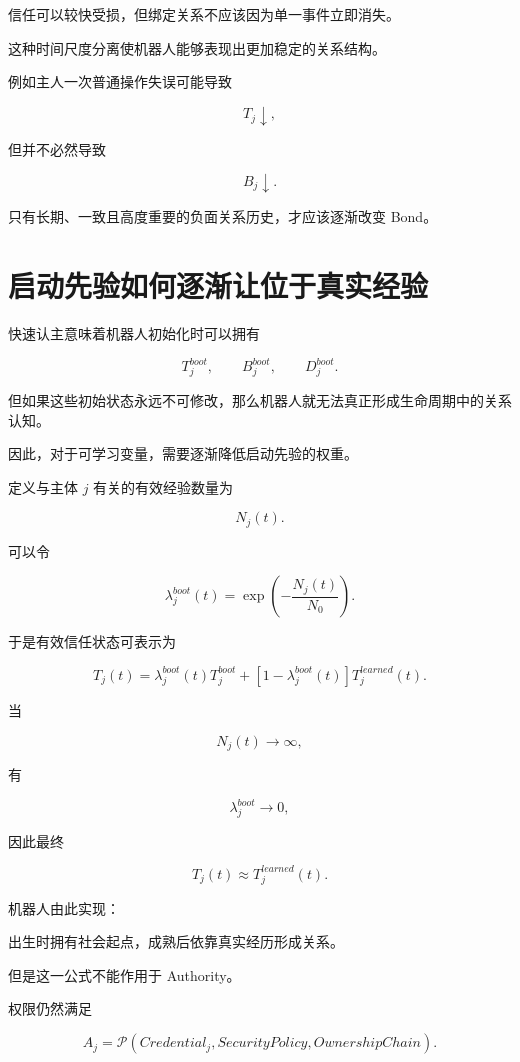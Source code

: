 \begin{statementbox}
信任可以较快受损，但绑定关系不应该因为单一事件立即消失。
\end{statementbox}

这种时间尺度分离使机器人能够表现出更加稳定的关系结构。

例如主人一次普通操作失误可能导致

\[
T_j\downarrow,
\]

但并不必然导致

\[
B_j\downarrow.
\]

只有长期、一致且高度重要的负面关系历史，才应该逐渐改变 Bond。


\section{启动先验如何逐渐让位于真实经验}

快速认主意味着机器人初始化时可以拥有

\[
T_j^{boot},
\qquad
B_j^{boot},
\qquad
D_j^{boot}.
\]

但如果这些初始状态永远不可修改，那么机器人就无法真正形成生命周期中的关系认知。

因此，对于可学习变量，需要逐渐降低启动先验的权重。

定义与主体 $j$ 有关的有效经验数量为

\[
N_j(t).
\]

可以令

\[
\lambda_j^{boot}(t)
=
\exp
\left(
-\frac{N_j(t)}{N_0}
\right).
\]

于是有效信任状态可表示为

\[
T_j(t)
=
\lambda_j^{boot}(t)
T_j^{boot}
+
\left[
1-\lambda_j^{boot}(t)
\right]
T_j^{learned}(t).
\]

当

\[
N_j(t)\rightarrow\infty,
\]

有

\[
\lambda_j^{boot}\rightarrow0,
\]

因此最终

\[
T_j(t)
\approx
T_j^{learned}(t).
\]

机器人由此实现：

\begin{statementbox}
出生时拥有社会起点，成熟后依靠真实经历形成关系。
\end{statementbox}

但是这一公式不能作用于 Authority。

权限仍然满足

\[
\boxed{
A_j
=
\mathcal P
(
Credential_j,
SecurityPolicy,
OwnershipChain
).
}
\]

